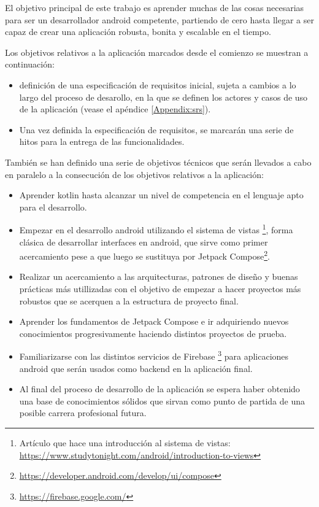 El objetivo principal de este trabajo es aprender muchas de las cosas necesarias para ser un desarrollador android competente, partiendo de cero hasta llegar a ser capaz de crear una aplicación robusta, bonita y escalable en el tiempo. 

Los objetivos relativos a la aplicación marcados desde el comienzo se muestran a continuación:
\begin{itemize}
	\item definición de una especificación de requisitos inicial, sujeta a cambios a lo largo del proceso de desarollo, en la que se definen los actores y casos de uso de la aplicación (vease el apéndice \ref{Appendix:srs}).
	\item Una vez definida la especificación de requisitos, se marcarán una serie de hitos para la entrega de las funcionalidades.
\end{itemize}

También se han definido una serie de objetivos técnicos que serán llevados a cabo en paralelo a la consecución de los objetivos relativos a la aplicación:
\begin{itemize}
	\item Aprender kotlin hasta alcanzar un nivel de competencia en el lenguaje apto para el desarrollo.
	\item Empezar en el desarrollo android utilizando el sistema de vistas \footnote{Artículo que hace una introducción al sistema de vistas: \url{https://www.studytonight.com/android/introduction-to-views} }, forma clásica de desarrollar interfaces en android, que sirve como primer acercamiento pese a que luego se sustituya por Jetpack Compose\footnote{\url{https://developer.android.com/develop/ui/compose}}. 
	\item Realizar un acercamiento a las arquitecturas, patrones de diseño y buenas prácticas más utillizadas con el objetivo de empezar a hacer proyectos más robustos que se acerquen a la estructura de proyecto final.
	\item Aprender los fundamentos de Jetpack Compose e ir adquiriendo nuevos conocimientos progresivamente haciendo distintos proyectos de prueba.
	\item Familiarizarse con las distintos servicios de Firebase \footnote{\url{https://firebase.google.com/}} para aplicaciones android que serán usados como backend en la aplicación final.
	\item Al final del proceso de desarrollo de la aplicación se espera haber obtenido una base de conocimientos sólidos que sirvan como punto de partida de una posible carrera profesional futura.
\end{itemize}

